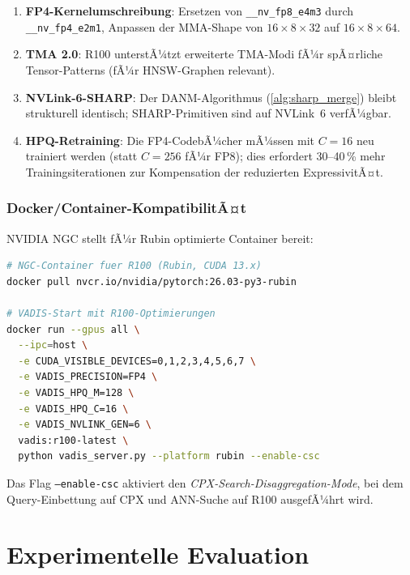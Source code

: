﻿\documentclass[12pt,a4paper]{article}
\begin{document}
\begin{enumerate}[leftmargin=1.4em, itemsep=2pt]
  \item \textbf{FP4-Kernelumschreibung}: Ersetzen von
        \texttt{\_\_nv\_fp8\_e4m3} durch \texttt{\_\_nv\_fp4\_e2m1},
        Anpassen der MMA-Shape von $16\times8\times32$ auf
        $16\times8\times64$.
  \item \textbf{TMA 2.0}: R100 unterstÃ¼tzt erweiterte TMA-Modi
        fÃ¼r spÃ¤rliche Tensor-Patterns (fÃ¼r HNSW-Graphen relevant).
  \item \textbf{NVLink-6-SHARP}: Der DANM-Algorithmus
        (\cref{alg:sharp_merge}) bleibt strukturell identisch;
        SHARP-Primitiven sind auf NVLink~6 verfÃ¼gbar.
  \item \textbf{HPQ-Retraining}: Die FP4-CodebÃ¼cher mÃ¼ssen
        mit $C=16$ neu trainiert werden (statt $C=256$ fÃ¼r FP8);
        dies erfordert 30--40\,\% mehr Trainingsiterati\-onen
        zur Kompensation der reduzierten ExpressivitÃ¤t.
\end{enumerate}

\subsubsection{Docker/Container-KompatibilitÃ¤t}

NVIDIA NGC stellt fÃ¼r Rubin optimierte Container bereit:

\begin{lstlisting}[language=bash, caption={VADIS-Container fÃ¼r R100/Rubin (NGC)}]
# NGC-Container fuer R100 (Rubin, CUDA 13.x)
docker pull nvcr.io/nvidia/pytorch:26.03-py3-rubin

# VADIS-Start mit R100-Optimierungen
docker run --gpus all \
  --ipc=host \
  -e CUDA_VISIBLE_DEVICES=0,1,2,3,4,5,6,7 \
  -e VADIS_PRECISION=FP4 \
  -e VADIS_HPQ_M=128 \
  -e VADIS_HPQ_C=16 \
  -e VADIS_NVLINK_GEN=6 \
  vadis:r100-latest \
  python vadis_server.py --platform rubin --enable-csc
\end{lstlisting}

\noindent Das Flag \texttt{--enable-csc} aktiviert den
\emph{CPX-Search-Disaggregation-Mode}, bei dem
Query-Einbettung auf CPX und ANN-Suche auf R100 ausgefÃ¼hrt wird.

\section{Experimentelle Evaluation}
\label{sec:experimente}
\end{document}
